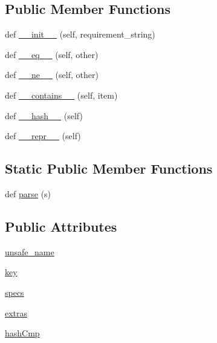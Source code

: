 \subsection*{Public Member Functions}
\begin{DoxyCompactItemize}
\item 
def \hyperlink{classpkg__resources_1_1Requirement_aeb1ecd04ffa958c098eaa2b163d06831}{\+\_\+\+\_\+init\+\_\+\+\_\+} (self, requirement\+\_\+string)
\item 
def \hyperlink{classpkg__resources_1_1Requirement_a987a18e8b60f9fa271f97df50be53376}{\+\_\+\+\_\+eq\+\_\+\+\_\+} (self, other)
\item 
def \hyperlink{classpkg__resources_1_1Requirement_ae1a6416c370d129ced1a755fa0ecdc86}{\+\_\+\+\_\+ne\+\_\+\+\_\+} (self, other)
\item 
def \hyperlink{classpkg__resources_1_1Requirement_aa4224c601acda9e7d94018e5d6a6350f}{\+\_\+\+\_\+contains\+\_\+\+\_\+} (self, item)
\item 
def \hyperlink{classpkg__resources_1_1Requirement_aa47dd60e7d032a4abefd829adb267459}{\+\_\+\+\_\+hash\+\_\+\+\_\+} (self)
\item 
def \hyperlink{classpkg__resources_1_1Requirement_a806f8c125c4c9687c23f450e346da5f6}{\+\_\+\+\_\+repr\+\_\+\+\_\+} (self)
\end{DoxyCompactItemize}
\subsection*{Static Public Member Functions}
\begin{DoxyCompactItemize}
\item 
def \hyperlink{classpkg__resources_1_1Requirement_a9be7f45af99c94ec9ca24807ecef986b}{parse} (s)
\end{DoxyCompactItemize}
\subsection*{Public Attributes}
\begin{DoxyCompactItemize}
\item 
\hyperlink{classpkg__resources_1_1Requirement_ae3d2f6723f48af3c5336b0dc92ea08b3}{unsafe\+\_\+name}
\item 
\hyperlink{classpkg__resources_1_1Requirement_a87c67bd2d8f19575cc4f0a5928b1cea9}{key}
\item 
\hyperlink{classpkg__resources_1_1Requirement_a1fce8b84c1951724bcd1b792a65a1be4}{specs}
\item 
\hyperlink{classpkg__resources_1_1Requirement_a6db71edd7cc700f63b3d0bfa715da67c}{extras}
\item 
\hyperlink{classpkg__resources_1_1Requirement_a13d1c727c4b2101a1db794d9784d9ca4}{hash\+Cmp}
\end{DoxyCompactItemize}


